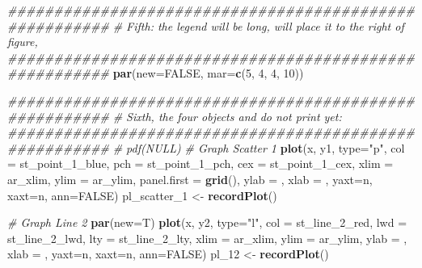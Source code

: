 \documentclass[
]{book}
\newenvironment{Shaded}{\begin{snugshade}}{\end{snugshade}}
\newcommand{\CommentTok}[1]{\textcolor[rgb]{0.56,0.35,0.01}{\textit{#1}}}
\newcommand{\DataTypeTok}[1]{\textcolor[rgb]{0.13,0.29,0.53}{#1}}
\newcommand{\DecValTok}[1]{\textcolor[rgb]{0.00,0.00,0.81}{#1}}
\newcommand{\KeywordTok}[1]{\textcolor[rgb]{0.13,0.29,0.53}{\textbf{#1}}}
\newcommand{\NormalTok}[1]{#1}
\newcommand{\OtherTok}[1]{\textcolor[rgb]{0.56,0.35,0.01}{#1}}
\newcommand{\StringTok}[1]{\textcolor[rgb]{0.31,0.60,0.02}{#1}}
\begin{document}
\begin{Shaded}
\begin{Highlighting}[]
\CommentTok{\#\#\#\#\#\#\#\#\#\#\#\#\#\#\#\#\#\#\#\#\#\#\#\#\#\#\#\#\#\#\#\#\#\#\#\#\#\#\#\#\#\#\#\#\#\#\#\#\#\#\#\#\#\#\#}
\CommentTok{\# Fifth: the legend will be long, will place it to the right of figure,}
\CommentTok{\#\#\#\#\#\#\#\#\#\#\#\#\#\#\#\#\#\#\#\#\#\#\#\#\#\#\#\#\#\#\#\#\#\#\#\#\#\#\#\#\#\#\#\#\#\#\#\#\#\#\#\#\#\#\#}
\KeywordTok{par}\NormalTok{(}\DataTypeTok{new=}\OtherTok{FALSE}\NormalTok{, }\DataTypeTok{mar=}\KeywordTok{c}\NormalTok{(}\DecValTok{5}\NormalTok{, }\DecValTok{4}\NormalTok{, }\DecValTok{4}\NormalTok{, }\DecValTok{10}\NormalTok{))}

\CommentTok{\#\#\#\#\#\#\#\#\#\#\#\#\#\#\#\#\#\#\#\#\#\#\#\#\#\#\#\#\#\#\#\#\#\#\#\#\#\#\#\#\#\#\#\#\#\#\#\#\#\#\#\#\#\#\#}
\CommentTok{\# Sixth, the four objects and do not print yet:}
\CommentTok{\#\#\#\#\#\#\#\#\#\#\#\#\#\#\#\#\#\#\#\#\#\#\#\#\#\#\#\#\#\#\#\#\#\#\#\#\#\#\#\#\#\#\#\#\#\#\#\#\#\#\#\#\#\#\#}
\CommentTok{\# pdf(NULL)}
\CommentTok{\# Graph Scatter 1}
\KeywordTok{plot}\NormalTok{(x, y1, }\DataTypeTok{type=}\StringTok{"p"}\NormalTok{,}
     \DataTypeTok{col =}\NormalTok{ st\_point\_}\DecValTok{1}\NormalTok{\_blue,}
     \DataTypeTok{pch =}\NormalTok{ st\_point\_}\DecValTok{1}\NormalTok{\_pch, }\DataTypeTok{cex =}\NormalTok{ st\_point\_}\DecValTok{1}\NormalTok{\_cex,}
     \DataTypeTok{xlim =}\NormalTok{ ar\_xlim, }\DataTypeTok{ylim =}\NormalTok{ ar\_ylim,}
     \DataTypeTok{panel.first =} \KeywordTok{grid}\NormalTok{(),}
     \DataTypeTok{ylab =} \StringTok{\textquotesingle{}\textquotesingle{}}\NormalTok{, }\DataTypeTok{xlab =} \StringTok{\textquotesingle{}\textquotesingle{}}\NormalTok{, }\DataTypeTok{yaxt=}\StringTok{\textquotesingle{}n\textquotesingle{}}\NormalTok{, }\DataTypeTok{xaxt=}\StringTok{\textquotesingle{}n\textquotesingle{}}\NormalTok{, }\DataTypeTok{ann=}\OtherTok{FALSE}\NormalTok{)}
\NormalTok{pl\_scatter\_}\DecValTok{1}\NormalTok{ \textless{}{-}}\StringTok{ }\KeywordTok{recordPlot}\NormalTok{()}

\CommentTok{\# Graph Line 2}
\KeywordTok{par}\NormalTok{(}\DataTypeTok{new=}\NormalTok{T)}
\KeywordTok{plot}\NormalTok{(x, y2, }\DataTypeTok{type=}\StringTok{"l"}\NormalTok{,}
     \DataTypeTok{col =}\NormalTok{ st\_line\_}\DecValTok{2}\NormalTok{\_red,}
     \DataTypeTok{lwd =}\NormalTok{ st\_line\_}\DecValTok{2}\NormalTok{\_lwd, }\DataTypeTok{lty =}\NormalTok{ st\_line\_}\DecValTok{2}\NormalTok{\_lty,}
     \DataTypeTok{xlim =}\NormalTok{ ar\_xlim, }\DataTypeTok{ylim =}\NormalTok{ ar\_ylim,}
     \DataTypeTok{ylab =} \StringTok{\textquotesingle{}\textquotesingle{}}\NormalTok{, }\DataTypeTok{xlab =} \StringTok{\textquotesingle{}\textquotesingle{}}\NormalTok{, }\DataTypeTok{yaxt=}\StringTok{\textquotesingle{}n\textquotesingle{}}\NormalTok{, }\DataTypeTok{xaxt=}\StringTok{\textquotesingle{}n\textquotesingle{}}\NormalTok{, }\DataTypeTok{ann=}\OtherTok{FALSE}\NormalTok{)}
\NormalTok{pl\_}\DecValTok{12}\NormalTok{ \textless{}{-}}\StringTok{ }\KeywordTok{recordPlot}\NormalTok{()}


\end{Highlighting}
\end{Shaded}
\end{document}

